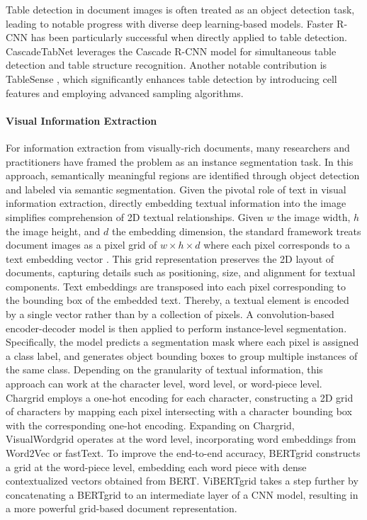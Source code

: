 Table detection in document images is often treated as an object detection task, leading to notable progress with diverse deep learning-based models. Faster R-CNN has been particularly successful when directly applied to table detection. CascadeTabNet \citep{prasad2020cascadetabnet} leverages the Cascade R-CNN \citep{cai2018cascade} model for simultaneous table detection and table structure recognition. Another notable contribution is TableSense \citep{dong2019tablesense}, which significantly enhances table detection by introducing cell features and employing advanced sampling algorithms.


\paragraph{Visual Information Extraction} 

For information extraction from visually-rich documents, many researchers and practitioners have framed the problem as an instance segmentation task. In this approach, semantically meaningful regions are identified through object detection and labeled via semantic segmentation. Given the pivotal role of text in visual information extraction, directly embedding textual information into the image simplifies comprehension of 2D textual relationships. Given $w$ the image width, $h$ the image height, and $d$ the embedding dimension, the standard framework treats document images as a pixel grid of $w \times h \times d$ where each pixel corresponds to a text embedding vector \citep{katti2018chargrid}. This grid representation preserves the 2D layout of documents, capturing details such as positioning, size, and alignment for textual components. Text embeddings are transposed into each pixel corresponding to the bounding box of the embedded text. Thereby, a textual element is encoded by a single vector rather than by a collection of pixels. A convolution-based encoder-decoder model is then applied to perform instance-level segmentation. Specifically, the model predicts a segmentation mask where each pixel is assigned a class label, and generates object bounding boxes to group multiple instances of the same class.  Depending on the granularity of textual information, this approach can work at the character level, word level, or word-piece level. Chargrid \citep{katti2018chargrid} employs a one-hot encoding for each character, constructing a 2D grid of characters by mapping each pixel intersecting with a character bounding box with the corresponding one-hot encoding. Expanding on Chargrid, VisualWordgrid \citep{kerroumi2021visualwordgrid} operates at the word level, incorporating word embeddings from Word2Vec or fastText. To improve the end-to-end accuracy, BERTgrid \citep{denk2019bertgrid} constructs a grid at the word-piece level, embedding each word piece with dense contextualized vectors obtained from \ac{BERT}. ViBERTgrid \citep{lin2021vibertgrid} takes a step further by concatenating a BERTgrid to an intermediate layer of a \ac{CNN} model, resulting in a more powerful grid-based document representation. 

